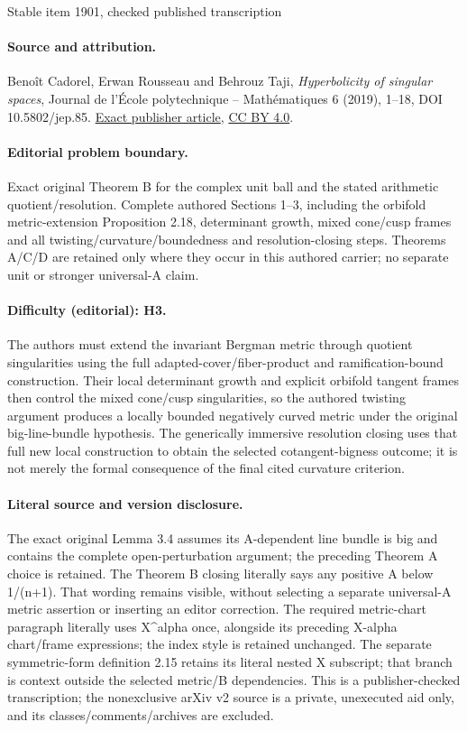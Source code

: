 \documentclass[10pt]{article}
\theoremstyle{definition}
\theoremstyle{remark}
\numberwithin{equation}{theorem}
\begin{document}
\begin{center}{\Large Stable item 1901, checked published transcription}\end{center}
\paragraph{Source and attribution.}
Benoît Cadorel, Erwan Rousseau and Behrouz Taji, \emph{Hyperbolicity of singular spaces}, Journal de l’École polytechnique -- Mathématiques 6 (2019), 1--18, DOI 10.5802/jep.85. \href{https://jep.centre-mersenne.org/articles/10.5802/jep.85/}{Exact publisher article}, \href{https://creativecommons.org/licenses/by/4.0/}{CC BY 4.0}.
\paragraph{Editorial problem boundary.}
Exact original Theorem B for the complex unit ball and the stated arithmetic quotient/resolution. Complete authored Sections 1–3, including the orbifold metric-extension Proposition 2.18, determinant growth, mixed cone/cusp frames and all twisting/curvature/boundedness and resolution-closing steps. Theorems A/C/D are retained only where they occur in this authored carrier; no separate unit or stronger universal-A claim.
\paragraph{Difficulty (editorial): H3.}
The authors must extend the invariant Bergman metric through quotient singularities using the full adapted-cover/fiber-product and ramification-bound construction. Their local determinant growth and explicit orbifold tangent frames then control the mixed cone/cusp singularities, so the authored twisting argument produces a locally bounded negatively curved metric under the original big-line-bundle hypothesis. The generically immersive resolution closing uses that full new local construction to obtain the selected cotangent-bigness outcome; it is not merely the formal consequence of the final cited curvature criterion.
\paragraph{Literal source and version disclosure.}
The exact original Lemma 3.4 assumes its A-dependent line bundle is big and contains the complete open-perturbation argument; the preceding Theorem A choice is retained. The Theorem B closing literally says any positive A below 1/(n+1). That wording remains visible, without selecting a separate universal-A metric assertion or inserting an editor correction. The required metric-chart paragraph literally uses X\textasciicircum{}alpha once, alongside its preceding X-alpha chart/frame expressions; the index style is retained unchanged. The separate symmetric-form definition 2.15 retains its literal nested X subscript; that branch is context outside the selected metric/B dependencies. This is a publisher-checked transcription; the nonexclusive arXiv v2 source is a private, unexecuted aid only, and its classes/comments/archives are excluded.
\end{document}
